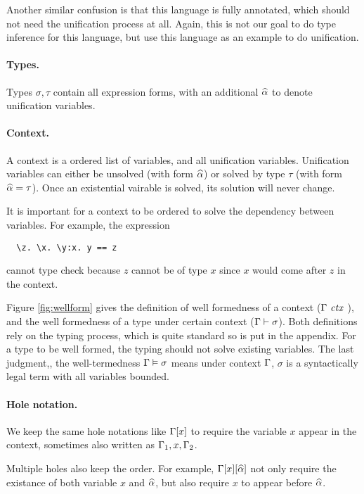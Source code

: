 Another similar confusion is that this language is fully annotated, which should
not need the unification process at all.
Again, this is not our goal to do type inference for this language, but use this
language as an example to do unification.

\paragraph{Types.} Types $\sigma, \tau$ contain all expression forms, with an
additional $\widehat{\alpha}$ to denote unification variables.

\paragraph{Context.} A context is a ordered list of variables, and all
unification variables.
Unification variables can either be unsolved
(with form $\widehat{\alpha}$) or solved by type $\tau$ (with form $\widehat{\alpha} = \tau$).
Once an existential vairable is solved, its solution will never change.

It is important for a context to be ordered to solve the dependency between
variables.
For example, the expression

\begin{lstlisting}
  \z. \x. \y:x. y == z
\end{lstlisting}

\noindent cannot type check because $z$ cannot be of type $x$ since $x$
would come after $z$ in the context.

Figure \ref{fig:wellform} gives the definition of well formedness of a context
($\Gamma \ \mathit{ctx}\ $),
and the well formedness of
a type under certain context ($\Gamma \vdash \sigma$).
Both definitions rely on the typing process,
which is quite standard so is put in the appendix.
For a type to be well formed, the typing should not solve existing variables.
The last judgment,, the
well-termedness
$\Gamma \vDash \sigma$ means under context $\Gamma$, $\sigma$ is a syntactically
legal term with all variables bounded.

\paragraph{Hole notation.} We keep the same hole notations like $\Gamma[x]$ to
require the variable $x$ appear in the context, sometimes also written as
$\Gamma_1, x, \Gamma_2$.

Multiple holes also keep the order. For example, $\Gamma[x][\widehat{\alpha}]$ not only
require the existance of both variable $x$ and $\widehat{\alpha}$, but also require $x$ to
appear before $\widehat{\alpha}$.

